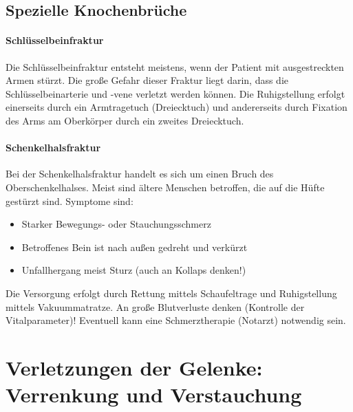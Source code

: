 \subsection{Spezielle Knochenbrüche}


\paragraph{Schlüsselbeinfraktur} Die Schlüsselbeinfraktur
entsteht meistens, wenn der Patient mit ausgestreckten Armen
stürzt. Die große Gefahr dieser Fraktur liegt darin, dass
die Schlüsselbeinarterie und -vene verletzt werden können.
Die Ruhigstellung erfolgt einerseits durch ein Armtragetuch
(Dreiecktuch) und andererseits durch Fixation des Arms am
Oberkörper durch ein zweites Dreiecktuch.

\paragraph{Schenkelhalsfraktur} Bei der Schenkelhalsfraktur
handelt es sich um einen Bruch des Oberschenkelhalses. Meist
sind ältere Menschen betroffen, die auf die Hüfte gestürzt
sind. Symptome sind:
\begin{itemize}
	\item Starker Bewegungs- oder Stauchungsschmerz
	\item Betroffenes Bein ist nach außen gedreht und verkürzt
	\item Unfallhergang meist Sturz (auch an Kollaps denken!)
\end{itemize}

Die Versorgung erfolgt durch Rettung mittels Schaufeltrage
und Ruhigstellung mittels Vakuummatratze. An große
Blutverluste denken (Kontrolle der Vitalparameter)!
Eventuell kann eine Schmerztherapie (Notarzt) notwendig
sein.

\section{Verletzungen der Gelenke: Verrenkung und Verstauchung}


